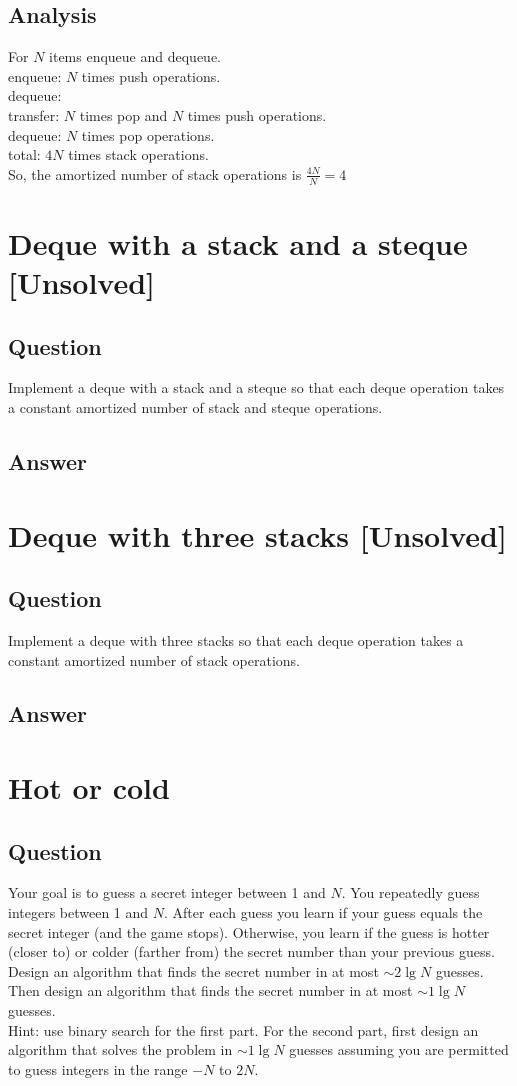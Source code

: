 \documentclass[12pt]{article}
\numberwithin{equation}{section}
\begin{document}
\subsection*{Analysis}
For $N$ items enqueue and dequeue.\\
enqueue: $N$ times push operations.\\
dequeue:\\
\indent transfer: $N$ times pop and $N$ times push  operations.\\
\indent dequeue: $N$ times pop operations.\\
total: $4N$ times stack operations.\\
So, the amortized number of stack operations is $\frac{4N}{N}=4$

\newpage
\section{Deque with a stack and a steque [Unsolved]}
\subsection*{Question}
Implement a deque with a stack and a steque
so that each deque operation takes a constant amortized number
of stack and steque operations.
\subsection*{Answer}

\newpage
\section{Deque with three stacks [Unsolved]}
\subsection*{Question}
Implement a deque with three stacks so that each
deque operation takes a constant amortized number of stack operations.
\subsection*{Answer}

\newpage
\section{Hot or cold}
\subsection*{Question}
Your goal is to guess a secret integer between 1 and $N$. You repeatedly 
guess integers between 1 and $N$. After each guess you learn if your guess equals the
secret integer (and the game stops). Otherwise, you learn if the guess is hotter (closer to)
or colder (farther from) the secret number than your previous guess. Design an algorithm
that finds the secret number in at most $\sim$$2\lg{N}$ guesses. Then design an algorithm
that finds the secret number in at most $\sim$$1\lg{N}$ guesses.\\
Hint: use binary search for the first part. For the second part, first design an algorithm
that solves the problem in $\sim$$1\lg{N}$ guesses assuming you are permitted to guess integers in
the range $-N$ to $2N$.
\end{document}
